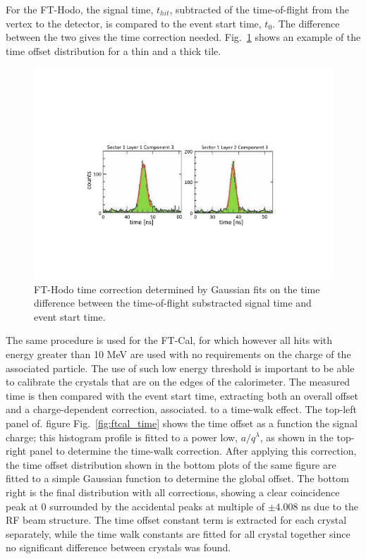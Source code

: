 For the FT-Hodo, the signal time, $t_{hit}$, subtracted of the time-of-flight from the vertex to the detector, is compared to the event start time, $t_0$. The difference between the two gives the time correction needed. Fig.~\ref{fig:fthodo_time} shows an example of the time offset distribution for a thin and a thick tile.
\begin{figure}
\includegraphics[width=1.0\columnwidth]{fig/fthodo_time.pdf}
\caption{FT-Hodo time correction determined by Gaussian fits on the time difference between the time-of-flight substracted signal time and event start time.}
\label{fig:fthodo_time}
\end{figure}

The same procedure is used for the FT-Cal, for which however all hits with energy greater than 10 MeV are used with no requirements on the charge of the associated particle. The use of such low energy threshold is important to be able to calibrate the crystals that are on the edges of the calorimeter. The measured time is then compared with the event start time, extracting both an overall offset and a charge-dependent correction, associated. to a time-walk effect. The top-left panel of. figure Fig.~\ref{fig:ftcal_time} shows the time offset as  a function the signal charge; this histogram profile is fitted to a power low, $a/q^\lambda$, as shown in the top-right panel to determine the time-walk correction. After applying this correction, the time offset distribution shown in the bottom plots  of the same figure are fitted to a simple Gaussian function to determine the global offset. The bottom right is the  final distribution with all corrections, showing a clear  coincidence peak at 0 surrounded by the accidental peaks at multiple of $\pm  4.008$ ns  due to the RF beam structure. The time offset constant term is extracted for each crystal separately, while the time walk constants are fitted for all crystal together since no significant difference between crystals was found. 


